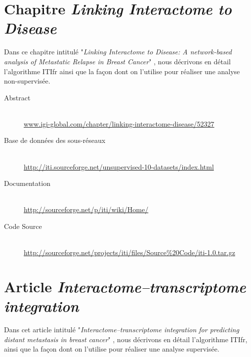 		\section{\textcolor{white!15!black}{Chapitre \emph{Linking Interactome to Disease}}}\label{app:Garcia2011}
			Dans ce chapitre intitulé "\emph{Linking Interactome to Disease: A network-based analysis of Metastatic Relapse in Breast Cancer}" \citep{Garcia2011}, nous décrivons en détail l'algorithme \acs{ITIfr} ainsi que la façon dont on l'utilise pour réaliser une analyse non-supervisée.

			\begin{description}
				\item [Abstract]                            \hfill \\
					\url{www.igi-global.com/chapter/linking-interactome-disease/52327}
				\item [Base de données des sous-réseaux]    \hfill \\
					\url{http://iti.sourceforge.net/unsupervised-10-datasets/index.html}
				\item [Documentation]                       \hfill \\
					\url{http://sourceforge.net/p/iti/wiki/Home/}
				\item [Code Source]                         \hfill \\
					\url{http://sourceforge.net/projects/iti/files/Source%20Code/iti-1.0.tar.gz}
			\end{description}

			

		\section{\textcolor{white!15!black}{Article \emph{Interactome–transcriptome integration}}}\label{app:Garcia2012}
			Dans cet article intitulé "\emph{Interactome–transcriptome integration for predicting distant metastasis in breast cancer}" \citep{Garcia2012}, nous décrivons en détail l'algorithme \acs{ITIfr}, ainsi que la façon dont on l'utilise pour réaliser une analyse supervisée.


